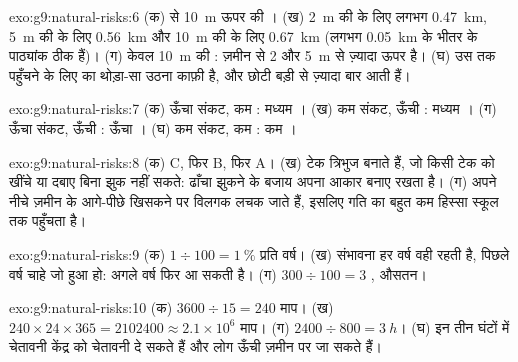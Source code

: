 \begin{solution}{exo:g9:natural-risks:6}
(क)  से \qty{10}{m} ऊपर की । (ख) \qty{2}{m} की  के लिए लगभग
\qty{0.47}{km}, \qty{5}{m} की  के लिए \qty{0.56}{km} और
\qty{10}{m} की  के लिए \qty{0.67}{km} (लगभग
\qty{0.05}{km} के भीतर के पाठ्यांक ठीक हैं)। (ग) केवल \qty{10}{m} की : ज़मीन
 से 2 और \qty{5}{m} से ज़्यादा ऊपर है। (घ) उस तक पहुँचने के लिए  का थोड़ा-सा उठना
काफ़ी है, और छोटी  बड़ी  से ज़्यादा बार आती
हैं।
\end{solution}

\begin{solution}{exo:g9:natural-risks:7}
(क) ऊँचा संकट, कम : मध्यम । (ख) कम संकट, ऊँची : मध्यम ।
(ग) ऊँचा संकट, ऊँची : ऊँचा । (घ) कम संकट, कम : कम
।
\end{solution}

\begin{solution}{exo:g9:natural-risks:8}
(क) C, फिर B, फिर A। (ख) टेक त्रिभुज बनाते हैं, जो किसी टेक को खींचे या दबाए बिना झुक नहीं
सकते: ढाँचा झुकने के बजाय अपना आकार बनाए रखता है। (ग) अपने नीचे ज़मीन के आगे-पीछे खिसकने
पर विलगक लचक जाते हैं, इसलिए गति का बहुत कम हिस्सा स्कूल तक पहुँचता
है।
\end{solution}

\begin{solution}{exo:g9:natural-risks:9}
(क) $1 \div 100 = 1~\%$ प्रति वर्ष। (ख) संभावना हर वर्ष वही रहती है, पिछले वर्ष चाहे जो
हुआ हो:  अगले वर्ष फिर आ सकती है।
(ग) $300 \div 100 = 3$ , औसतन।
\end{solution}

\begin{solution}{exo:g9:natural-risks:10}
(क) $3600 \div 15 = 240$ माप। (ख) $240 \times 24 \times 365 =
\num{2102400} \approx 2.1 \times 10^6$ माप। (ग) $2400 \div 800 =
\qty{3}{h}$। (घ) इन तीन घंटों में चेतावनी केंद्र  को
चेतावनी दे सकते हैं और लोग ऊँची ज़मीन पर जा सकते हैं।
\end{solution}

